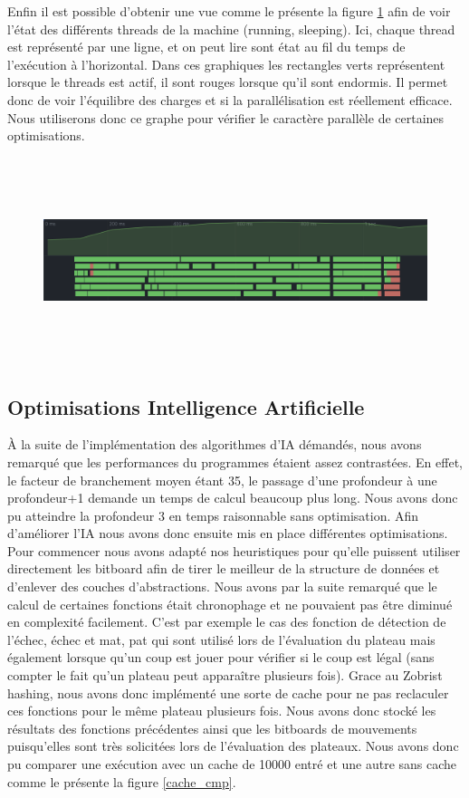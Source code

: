 \documentclass{article}
\begin{document}
Enfin il est possible d'obtenir une vue comme le présente la figure \ref{thread_ex} afin de voir l'état des différents threads de la machine (running, sleeping). Ici, chaque thread est représenté
par une ligne, et on peut lire sont état au fil du temps de l'exécution à l'horizontal. Dans ces graphiques les rectangles verts
représentent lorsque le threads est actif, il sont rouges lorsque qu'il sont endormis. Il permet donc de voir l'équilibre des charges et si la parallélisation est réellement efficace.
Nous utiliserons donc ce graphe pour vérifier le caractère parallèle de certaines optimisations.

\begin{figure}[h]
    \centering
    \includegraphics[width=\textwidth,height=6.0cm,keepaspectratio]{threads_ex.png}
    \caption{}
    \label{thread_ex}
\end{figure}

\subsection{Optimisations Intelligence Artificielle}
À la suite de l'implémentation des algorithmes d'IA démandés, nous avons remarqué que les performances du programmes étaient assez contrastées. En effet, le facteur
de branchement moyen étant 35, le passage d'une profondeur à une profondeur+1 demande un temps de calcul beaucoup plus long. Nous avons donc pu atteindre la profondeur 3
en temps raisonnable sans optimisation. Afin d'améliorer l'IA nous avons donc ensuite mis en place différentes optimisations. Pour commencer nous avons adapté nos heuristiques
pour qu'elle puissent utiliser directement les bitboard afin de tirer le meilleur de la structure de données et d'enlever des couches d'abstractions. Nous avons par la suite 
remarqué que le calcul de certaines fonctions était chronophage et ne pouvaient pas être diminué en complexité facilement. C'est par exemple le cas des fonction de détection de 
l'échec, échec et mat, pat qui sont utilisé lors de l'évaluation du plateau mais également lorsque qu'un coup est jouer pour vérifier si le coup est légal (sans compter le fait 
qu'un plateau peut apparaître plusieurs fois). Grace au Zobrist hashing, nous avons donc implémenté une sorte de cache pour ne pas reclaculer ces fonctions pour le même plateau 
plusieurs fois. Nous avons donc stocké les résultats des fonctions précédentes ainsi que les bitboards de mouvements puisqu'elles sont très solicitées lors de l'évaluation des
plateaux. Nous avons donc pu comparer une exécution avec un cache de 10000 entré et une autre sans cache comme le présente la figure \ref{cache_cmp}.
\end{document}
